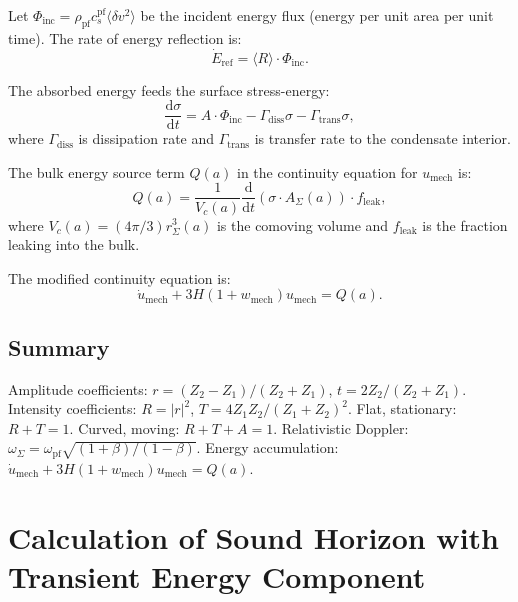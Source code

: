 \documentclass[11pt,a4paper]{article}
\newcommand{\dx}{\mathrm{d}}
\theoremstyle{definition}
\begin{document}
Let $\Phi_{\text{inc}} = \rho_{\mathrm{pf}} c_s^{\mathrm{pf}} \langle \delta v^2 \rangle$ be the incident energy flux (energy per unit area per unit time). The rate of energy reflection is:
\begin{equation}
\dot{E}_{\text{ref}} = \langle R \rangle \cdot \Phi_{\text{inc}}.
\end{equation}

The absorbed energy feeds the surface stress-energy:
\begin{equation}
\frac{\dx \sigma}{\dx t} = A \cdot \Phi_{\text{inc}} - \Gamma_{\text{diss}} \sigma - \Gamma_{\text{trans}} \sigma,
\end{equation}
where $\Gamma_{\text{diss}}$ is dissipation rate and $\Gamma_{\text{trans}}$ is transfer rate to the condensate interior.

The bulk energy source term $Q(a)$ in the continuity equation for $u_{\mathrm{mech}}$ is:
\begin{equation}
Q(a) = \frac{1}{V_c(a)} \frac{\dx}{\dx t} (\sigma \cdot A_\Sigma(a)) \cdot f_{\text{leak}},
\end{equation}
where $V_c(a) = (4\pi/3) r_\Sigma^3(a)$ is the comoving volume and $f_{\text{leak}}$ is the fraction leaking into the bulk.

The modified continuity equation is:
\begin{equation}
\boxed{\dot{u}_{\mathrm{mech}} + 3H(1 + w_{\mathrm{mech}}) u_{\mathrm{mech}} = Q(a).}
\end{equation}

\subsection{Summary}
\label{app:impedance_summary}

Amplitude coefficients: $r = (Z_2 - Z_1)/(Z_2 + Z_1)$, $t = 2Z_2/(Z_2 + Z_1)$. Intensity coefficients: $R = |r|^2$, $T = 4Z_1Z_2/(Z_1+Z_2)^2$. Flat, stationary: $R + T = 1$. Curved, moving: $R + T + A = 1$. Relativistic Doppler: $\omega_\Sigma = \omega_{\mathrm{pf}} \sqrt{(1+\beta)/(1-\beta)}$. Energy accumulation: $\dot{u}_{\mathrm{mech}} + 3H(1 + w_{\mathrm{mech}}) u_{\mathrm{mech}} = Q(a)$.


\section{Calculation of Sound Horizon with Transient Energy Component}
\label{app:sound_horizon}
\end{document}

